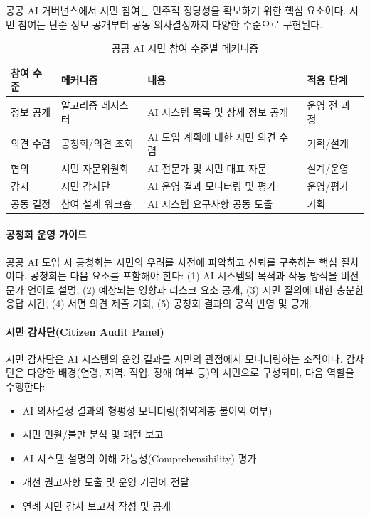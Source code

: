 공공 AI 거버넌스에서 시민 참여는 민주적 정당성을 확보하기 위한 핵심 요소이다. 시민 참여는 단순 정보 공개부터 공동 의사결정까지 다양한 수준으로 구현된다.

\begin{table}[htbp]
\centering
\caption{공공 AI 시민 참여 수준별 메커니즘}
\label{tab:18_citizen}
\begin{tabularx}{\textwidth}{p{2cm}p{3cm}Xp{2.5cm}}
\toprule
\textbf{참여 수준} & \textbf{메커니즘} & \textbf{내용} & \textbf{적용 단계} \\
\midrule
정보 공개 & 알고리즘 레지스터 & AI 시스템 목록 및 상세 정보 공개 & 운영 전 과정 \\
의견 수렴 & 공청회/의견 조회 & AI 도입 계획에 대한 시민 의견 수렴 & 기획/설계 \\
협의 & 시민 자문위원회 & AI 전문가 및 시민 대표 자문 & 설계/운영 \\
감시 & 시민 감사단 & AI 운영 결과 모니터링 및 평가 & 운영/평가 \\
공동 결정 & 참여 설계 워크숍 & AI 시스템 요구사항 공동 도출 & 기획 \\
\bottomrule
\end{tabularx}
\end{table}

\paragraph{공청회 운영 가이드}

공공 AI 도입 시 공청회는 시민의 우려를 사전에 파악하고 신뢰를 구축하는 핵심 절차이다. 공청회는 다음 요소를 포함해야 한다: (1) AI 시스템의 목적과 작동 방식을 비전문가 언어로 설명, (2) 예상되는 영향과 리스크 요소 공개, (3) 시민 질의에 대한 충분한 응답 시간, (4) 서면 의견 제출 기회, (5) 공청회 결과의 공식 반영 및 공개.

\paragraph{시민 감사단(Citizen Audit Panel)}

시민 감사단은 AI 시스템의 운영 결과를 시민의 관점에서 모니터링하는 조직이다. 감사단은 다양한 배경(연령, 지역, 직업, 장애 여부 등)의 시민으로 구성되며, 다음 역할을 수행한다:

\begin{itemize}
    \item AI 의사결정 결과의 형평성 모니터링(취약계층 불이익 여부)
    \item 시민 민원/불만 분석 및 패턴 보고
    \item AI 시스템 설명의 이해 가능성(Comprehensibility) 평가
    \item 개선 권고사항 도출 및 운영 기관에 전달
    \item 연례 시민 감사 보고서 작성 및 공개
\end{itemize}

